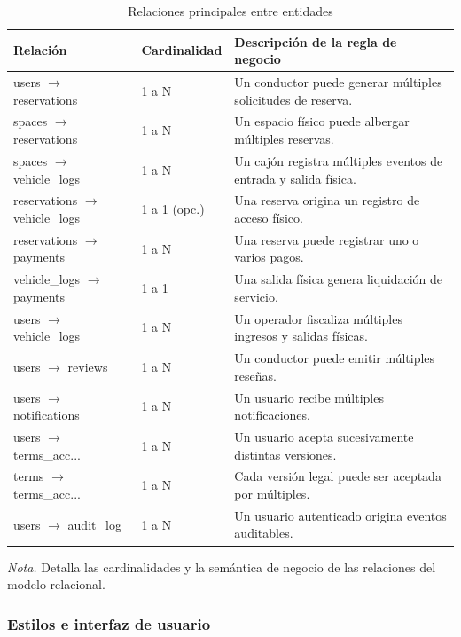 \begin{table}[htbp]
\caption{Relaciones principales entre entidades}
\label{tab:relaciones_entidades}
\begin{tabular}{@{}p{3.5cm} p{2cm} p{9cm}@{}}
\toprule
\textbf{Relación} & \textbf{Cardinalidad} & \textbf{Descripción de la regla de negocio} \\
\midrule
users $\rightarrow$ reservations & 1 a N & Un conductor puede generar múltiples solicitudes de reserva. \\
spaces $\rightarrow$ reservations & 1 a N & Un espacio físico puede albergar múltiples reservas. \\
spaces $\rightarrow$ vehicle\_logs & 1 a N & Un cajón registra múltiples eventos de entrada y salida física. \\
reservations $\rightarrow$ vehicle\_logs & 1 a 1 (opc.) & Una reserva origina un registro de acceso físico. \\
reservations $\rightarrow$ payments & 1 a N & Una reserva puede registrar uno o varios pagos. \\
vehicle\_logs $\rightarrow$ payments & 1 a 1 & Una salida física genera liquidación de servicio. \\
users $\rightarrow$ vehicle\_logs & 1 a N & Un operador fiscaliza múltiples ingresos y salidas físicas. \\
users $\rightarrow$ reviews & 1 a N & Un conductor puede emitir múltiples reseñas. \\
users $\rightarrow$ notifications & 1 a N & Un usuario recibe múltiples notificaciones. \\
users $\rightarrow$ terms\_acc... & 1 a N & Un usuario acepta sucesivamente distintas versiones. \\
terms $\rightarrow$ terms\_acc... & 1 a N & Cada versión legal puede ser aceptada por múltiples. \\
users $\rightarrow$ audit\_log & 1 a N & Un usuario autenticado origina eventos auditables. \\
\bottomrule
\end{tabular}
\par\vspace{0.2cm}
\textit{Nota.} Detalla las cardinalidades y la semántica de negocio de las relaciones del modelo relacional.
\end{table}

\subsubsection{Estilos e interfaz de usuario}

